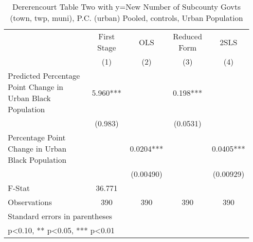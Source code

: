 \begin{table}[htbp]\centering
\def\sym#1{\ifmmode^{#1}\else\(^{#1}\)\fi}
\caption{Dererencourt Table Two with y=New Number of Subcounty Govts (town, twp, muni), P.C. (urban)  Pooled,  controls, Urban Population}
\begin{tabular}{l*{4}{c}}
\toprule
                    & First Stage   &         OLS   &Reduced Form   &        2SLS   \\
                    &\multicolumn{1}{c}{(1)}   &\multicolumn{1}{c}{(2)}   &\multicolumn{1}{c}{(3)}   &\multicolumn{1}{c}{(4)}   \\
\midrule
Predicted Percentage Point Change in Urban Black Population&       5.960***&               &       0.198***&               \\
                    &     (0.983)   &               &    (0.0531)   &               \\
\addlinespace
Percentage Point Change in Urban Black Population&               &      0.0204***&               &      0.0405***\\
                    &               &   (0.00490)   &               &   (0.00929)   \\
\midrule
F-Stat              &      36.771   &               &               &               \\
Observations        &         390   &         390   &         390   &         390   \\
\bottomrule
\multicolumn{5}{l}{\footnotesize Standard errors in parentheses}\\
\multicolumn{5}{l}{\footnotesize * p<0.10, ** p<0.05, *** p<0.01}\\
\end{tabular}
\end{table}
